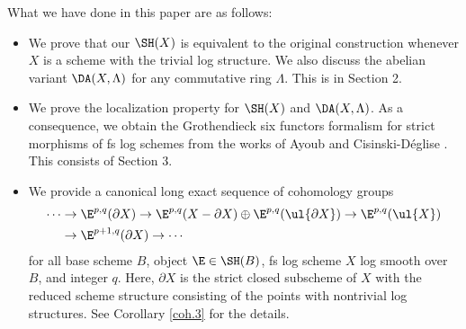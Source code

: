 \documentclass[10pt]{amsart}
\begin{document}
What we have done in this paper are as follows:
\begin{itemize}
\item We prove that our $\SH(X)$ is equivalent to the original construction \cite[Definition 5.7]{zbMATH01194164} whenever $X$ is a scheme with the trivial log structure.
We also discuss the abelian variant $\DA(X,\Lambda)$  for any commutative ring $\Lambda$.
This is in Section 2.
\item We prove the localization property for $\SH(X)$ and $\DA(X,\Lambda)$.
As a consequence, we obtain the Grothendieck six functors formalism for strict morphisms of fs log schemes from the works of Ayoub \cite{Ayo07} and Cisinski-D\'eglise \cite{CD19}.
This consists of Section 3.
\item We provide a canonical long exact sequence of cohomology groups
\begin{align*}
\cdots
&\to
\E^{p,q}(\partial X)
\to
\E^{p,q}(X-\partial X)
\oplus
\E^{p,q}(\ul{\partial X})
\to
\E^{p,q}(\ul{X})
\\
&\to
\E^{p+1,q}(\partial X)
\to
\cdots
\end{align*}
for all base scheme $B$, object $\E\in \SH(B)$, fs log scheme $X$ log smooth over $B$, and integer $q$.
Here, $\partial X$ is the strict closed subscheme of $X$ with the reduced scheme structure consisting of the points with nontrivial log structures.
See Corollary \ref{coh.3} for the details.
\end{itemize}
\end{document}
